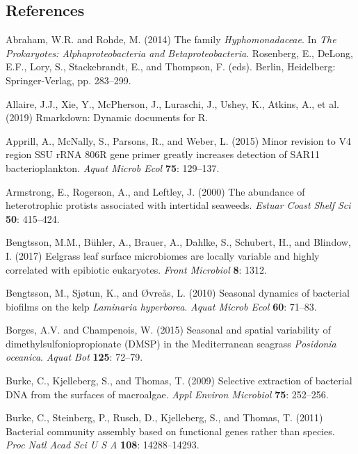 \documentclass[12pt,]{article}
\begin{document}
\hypertarget{references}{%
\subsection{References}\label{references}}

\hypertarget{refs}{}
\leavevmode\hypertarget{ref-Abraham2014}{}%
Abraham, W.R. and Rohde, M. (2014) The family \emph{Hyphomonadaceae}. In
\emph{The Prokaryotes: Alphaproteobacteria and Betaproteobacteria}.
Rosenberg, E., DeLong, E.F., Lory, S., Stackebrandt, E., and Thompson,
F. (eds). Berlin, Heidelberg: Springer-Verlag, pp. 283--299.

\leavevmode\hypertarget{ref-Allaire2019}{}%
Allaire, J.J., Xie, Y., McPherson, J., Luraschi, J., Ushey, K., Atkins,
A., et al. (2019) Rmarkdown: Dynamic documents for R.

\leavevmode\hypertarget{ref-Apprill2015}{}%
Apprill, A., McNally, S., Parsons, R., and Weber, L. (2015) Minor
revision to V4 region SSU rRNA 806R gene primer greatly increases
detection of SAR11 bacterioplankton. \emph{Aquat Microb Ecol}
\textbf{75}: 129--137.

\leavevmode\hypertarget{ref-Armstrong2000}{}%
Armstrong, E., Rogerson, A., and Leftley, J. (2000) The abundance of
heterotrophic protists associated with intertidal seaweeds. \emph{Estuar
Coast Shelf Sci} \textbf{50}: 415--424.

\leavevmode\hypertarget{ref-Bengtsson2017}{}%
Bengtsson, M.M., Bühler, A., Brauer, A., Dahlke, S., Schubert, H., and
Blindow, I. (2017) Eelgrass leaf surface microbiomes are locally
variable and highly correlated with epibiotic eukaryotes. \emph{Front
Microbiol} \textbf{8}: 1312.

\leavevmode\hypertarget{ref-Bengtsson2010}{}%
Bengtsson, M., Sjøtun, K., and Øvreås, L. (2010) Seasonal dynamics of
bacterial biofilms on the kelp \emph{Laminaria hyperborea}. \emph{Aquat
Microb Ecol} \textbf{60}: 71--83.

\leavevmode\hypertarget{ref-Borges2015}{}%
Borges, A.V. and Champenois, W. (2015) Seasonal and spatial variability
of dimethylsulfoniopropionate (DMSP) in the Mediterranean seagrass
\emph{Posidonia oceanica}. \emph{Aquat Bot} \textbf{125}: 72--79.

\leavevmode\hypertarget{ref-Burke2009}{}%
Burke, C., Kjelleberg, S., and Thomas, T. (2009) Selective extraction of
bacterial DNA from the surfaces of macroalgae. \emph{Appl Environ
Microbiol} \textbf{75}: 252--256.

\leavevmode\hypertarget{ref-Burke2011}{}%
Burke, C., Steinberg, P., Rusch, D., Kjelleberg, S., and Thomas, T.
(2011) Bacterial community assembly based on functional genes rather
than species. \emph{Proc Natl Acad Sci U S A} \textbf{108}:
14288--14293.
\end{document}
